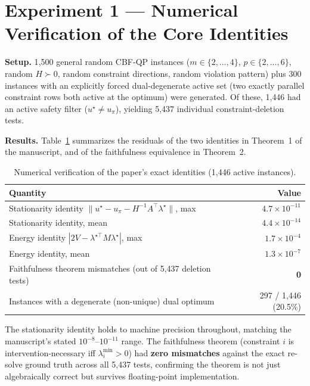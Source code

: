 \documentclass[11pt]{article}
\begin{document}
\section{Experiment 1 --- Numerical Verification of the Core Identities}
\label{sec:exp1}

\textbf{Setup.} 1{,}500 general random CBF-QP instances ($m\in\{2,\dots,4\}$,
$p\in\{2,\dots,6\}$, random $H\succ0$, random constraint directions, random
violation pattern) plus 300 instances with an explicitly forced dual-degenerate
active set (two exactly parallel constraint rows both active at the optimum)
were generated. Of these, 1{,}446 had an active safety filter ($u^\star\neq
u_\pi$), yielding 5{,}437 individual constraint-deletion tests.

\textbf{Results.} Table~\ref{tab:exp1} summarizes the residuals of the two
identities in Theorem~1 of the manuscript, and of the faithfulness
equivalence in Theorem~2.

\begin{table}[h]
\centering
\caption{Numerical verification of the paper's exact identities (1{,}446 active instances).}
\label{tab:exp1}
\begin{tabular}{lr}
\toprule
Quantity & Value \\
\midrule
Stationarity identity $\|u^\star-u_\pi-H^{-1}A^\top\lambda^\star\|$, max & $4.7\times10^{-11}$ \\
Stationarity identity, mean & $4.4\times10^{-14}$ \\
Energy identity $|2V-\lambda^{\star\top}M\lambda^\star|$, max & $1.7\times10^{-4}$ \\
Energy identity, mean & $1.3\times10^{-7}$ \\
Faithfulness theorem mismatches (out of 5{,}437 deletion tests) & \cellcolor{ok!25}\textbf{0} \\
Instances with a degenerate (non-unique) dual optimum & 297 / 1{,}446 (20.5\%) \\
\bottomrule
\end{tabular}
\end{table}

The stationarity identity holds to machine precision throughout, matching the
manuscript's stated $10^{-8}$--$10^{-11}$ range. The faithfulness theorem
(constraint $i$ is intervention-necessary iff $\lambda_i^{\min}>0$) had
\textbf{zero mismatches} against the exact re-solve ground truth across all
5{,}437 tests, confirming the theorem is not just algebraically correct but
survives floating-point implementation.
\end{document}
